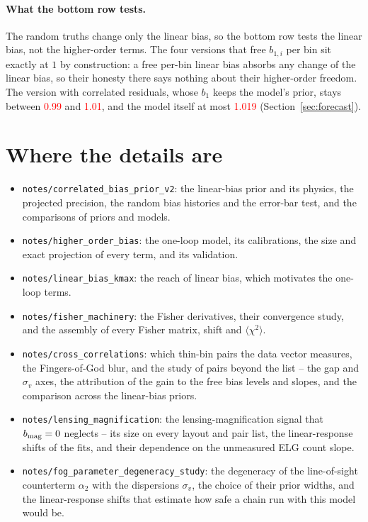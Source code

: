 \documentclass[11pt]{article}
\newif\ifnumbersfinal
\newcommand{\refresh}[1]{\ifnumbersfinal#1\else\textcolor{red}{#1}\fi}
\newcommand{\EtaW}{\refresh{1.019}}
\newcommand{\EtaCorrMin}{\refresh{0.99}}
\newcommand{\EtaCorrMax}{\refresh{1.01}}
\begin{document}
\paragraph{What the bottom row tests.}
The random truths change only the linear bias, so the bottom row tests
the linear bias, not the higher-order terms.  The four versions that
free $b_{1,i}$ per bin sit exactly at $1$ by construction: a free
per-bin linear bias absorbs any change of the linear bias, so their
honesty there says nothing about their higher-order freedom.  The
version with correlated residuals, whose $b_1$ keeps the model's prior,
stays between \EtaCorrMin{} and \EtaCorrMax{}, and the model itself at
most \EtaW{} (Section~\ref{sec:forecast}).

\section{Where the details are}
\label{sec:details}

\begin{itemize}
  \setlength{\itemsep}{1pt}
  \item \texttt{notes/correlated\_bias\_prior\_v2}: the linear-bias
    prior and its physics, the projected precision, the random bias
    histories and the error-bar test, and the comparisons of priors and
    models.
  \item \texttt{notes/higher\_order\_bias}: the one-loop model, its
    calibrations, the size and exact projection of every term, and its
    validation.
  \item \texttt{notes/linear\_bias\_kmax}: the reach of linear bias,
    which motivates the one-loop terms.
  \item \texttt{notes/fisher\_machinery}: the Fisher derivatives, their
    convergence study, and the assembly of every Fisher matrix, shift
    and $\langle\chi^2\rangle$.
  \item \texttt{notes/cross\_correlations}: which thin-bin pairs the data
    vector measures, the Fingers-of-God blur, and the study of pairs
    beyond the list -- the gap and $\sigma_v$ axes, the attribution of
    the gain to the free bias levels and slopes, and the comparison
    across the linear-bias priors.
  \item \texttt{notes/lensing\_magnification}: the lensing-magnification
    signal that $b_{\rm mag} = 0$ neglects -- its size on every layout
    and pair list, the linear-response shifts of the fits, and their
    dependence on the unmeasured ELG count slope.
  \item \texttt{notes/fog\_parameter\_degeneracy\_study}: the degeneracy
    of the line-of-sight counterterm $\alpha_2$ with the dispersions
    $\sigma_v$, the choice of their prior widths, and the
    linear-response shifts that estimate how safe a chain run with this
    model would be.
\end{itemize}
\end{document}
